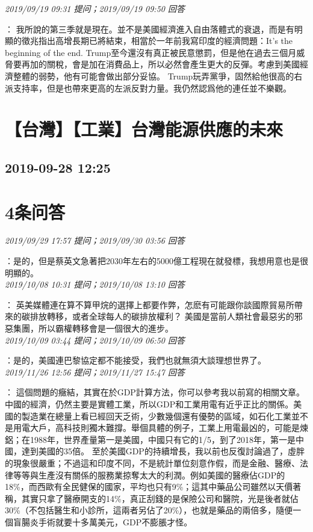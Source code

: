 \documentclass[twocolumn]{ctexart}
\begin{document}
\textit{\hfill\noindent\small 2019/09/19 09:31 提问；2019/09/19 09:50 回答}

：
我所說的第三季就是現在。並不是美國經濟進入自由落體式的衰退，而是有明顯的徵兆指出高增長期已將結束，相當於一年前我寫印度的經濟問題：It's the beginning of the end.
Trump至今還沒有真正被民意懲罰，但是他在過去三個月威脅要再加的關稅，會是加在消費品上，所以必然會產生更大的反彈。考慮到美國經濟整體的弱勢，他有可能會做出部分妥協。
Trump玩弄黨爭，固然給他很高的右派支持率，但是也帶來更高的左派反對力量。我仍然認爲他的連任並不樂觀。
\\


\section{【台灣】【工業】台灣能源供應的未來}
\subsection{2019-09-28 12:25}


\section{4条问答}

\textit{\hfill\noindent\small 2019/09/29 17:57 提问；2019/09/30 03:56 回答}

：是的，但是蔡英文急著把2030年左右的5000億工程現在就發標，我想用意也是很明顯的。
\\

\textit{\hfill\noindent\small 2019/10/08 10:31 提问；2019/10/08 13:10 回答}

：
英美媒體連在算不算甲烷的選擇上都要作弊，怎麽有可能跟你談國際貿易所帶來的碳排放轉移，或者全球每人的碳排放權利？
美國是當前人類社會最惡劣的邪惡集團，所以霸權轉移會是一個很大的進步。
\\

\textit{\hfill\noindent\small 2019/10/09 03:44 提问；2019/10/09 06:50 回答}

：是的，美國連巴黎協定都不能接受，我們也就無須大談理想世界了。
\\

\textit{\hfill\noindent\small 2019/11/26 12:56 提问；2019/11/27 15:47 回答}

：
這個問題的癥結，其實在於GDP計算方法，你可以參考我以前寫的相關文章。 
中國的經濟，仍然主要是實體工業，所以GDP和工業用電有近乎正比的關係。美國的製造業在總量上看已經回天乏術，少數幾個還有優勢的區域，如石化工業並不是用電大戶，高科技則獨木難撐。舉個具體的例子，工業上用電最凶的，可能是煉鋁；在1988年，世界產量第一是美國，中國只有它的1/5，到了2018年，第一是中國，達到美國的35倍。 
至於美國GDP的持續增長，我以前也反復討論過了，虛胖的現象很嚴重；不過這和印度不同，不是統計單位刻意作假，而是金融、醫療、法律等等與生產沒有關係的服務業掠奪太大的利潤。例如美國的醫療佔GDP的18\%，而西歐有全民健保的國家，平均也只有9\%；這其中藥品公司雖然以天價著稱，其實只拿了醫療開支的14\%，真正刮錢的是保險公司和醫院，光是後者就佔30\%（不包括醫生和小診所，這兩者另佔了20\%），也就是藥品的兩倍多，隨便一個盲腸炎手術就要十多萬美元，GDP不膨脹才怪。
\\
\end{document}
